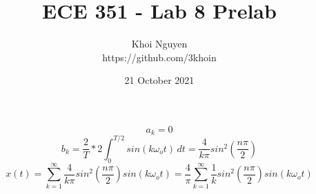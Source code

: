 \documentclass[11pt,a4,titlepage]{article}
\title{ECE 351 - Lab 8 Prelab}
\author{Khoi Nguyen \\ https://github.com/3khoin}
\date{21 October 2021}
\begin{document}
\maketitle
\pagebreak

\[a_{k} = 0\]
\[b_{k} = \frac{2}{T}*2\int_{0}^{T/2} sin(k\omega_{o}t) \,dt = \frac{4}{k\pi}sin^2(\frac{n\pi}{2})\]
\[x(t) = \sum_{k=1}^{\infty} \frac{4}{k\pi}sin^2(\frac{n\pi}{2})sin(k\omega_{o}t) = \frac{4}{\pi}\sum_{k=1}^{\infty}\frac{1}{k}sin^2(\frac{n\pi}{2})sin(k\omega_{o}t)\]
\end{document}
